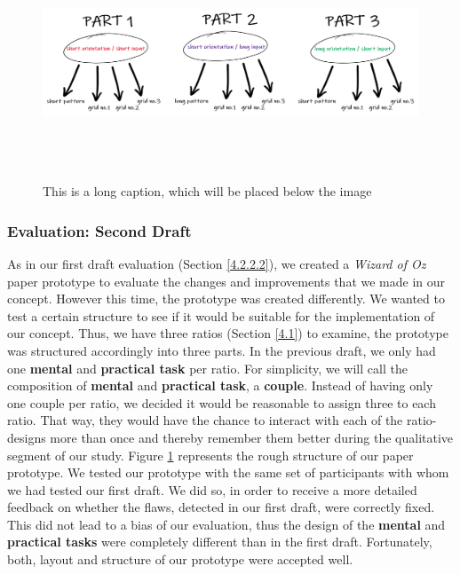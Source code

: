 \begin{figure}[t!]
\centering
\includegraphics[width=15cm, height=7cm]{Chapters/graphics/prototypeStructure.PNG}
\caption[This is a short caption for the index]{This is a long caption, which will be placed below the image}
\label{fig:prototype}
\end{figure}

\subsubsection{Evaluation: Second Draft} \label{4.2.2.4}

As in our first draft evaluation (Section \ref{4.2.2.2}), we created a \textit{Wizard of Oz} paper prototype \cite{Butz2014} to evaluate the changes and improvements that we made in our concept. However this time, the prototype was created differently. We wanted to test a certain structure to see if it would be suitable for the implementation of our concept. Thus, we have three ratios (Section \ref{4.1}) to examine, the prototype was structured accordingly into three parts. In the previous draft, we only had one \textbf{mental} and \textbf{practical task} per ratio. For simplicity, we will call the composition of \textbf{mental} and \textbf{practical task}, a \textbf{couple}. Instead of having only one couple per ratio, we decided it would be reasonable to assign three to each ratio. That way, they  would have the chance to interact with each of the ratio-designs more than once and thereby remember them better during the qualitative segment of our study. Figure \ref{fig:prototype} represents the rough structure of our paper prototype. We tested our prototype with the same set of participants with whom we had tested our first draft. We did so, in order to receive a more detailed feedback on whether the flaws, detected in our first draft, were correctly fixed. This did not lead to a bias of our evaluation, thus the design of the \textbf{mental} and \textbf{practical tasks} were completely different than in the first draft. Fortunately, both, layout and structure of our prototype were accepted well. \\

